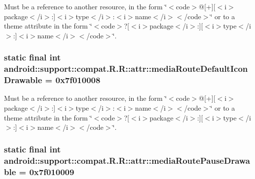 Must be a reference to another resource, in the form \char`\"{}$<$code$>$@\mbox{[}+\mbox{]}\mbox{[}$<$i$>$package$<$/i$>$:\mbox{]}$<$i$>$type$<$/i$>$:$<$i$>$name$<$/i$>$$<$/code$>$\char`\"{} or to a theme attribute in the form \char`\"{}$<$code$>$?\mbox{[}$<$i$>$package$<$/i$>$:\mbox{]}\mbox{[}$<$i$>$type$<$/i$>$:\mbox{]}$<$i$>$name$<$/i$>$$<$/code$>$\char`\"{}. \hypertarget{classandroid_1_1support_1_1compat_1_1_r_1_1attr_fb427320298ec28143324f5e9758ca66}{
\subsubsection[{mediaRouteDefaultIconDrawable}]{\setlength{\rightskip}{0pt plus 5cm}static final int android::support::compat.R.R::attr::mediaRouteDefaultIconDrawable = 0x7f010008}}
\label{classandroid_1_1support_1_1compat_1_1_r_1_1attr_fb427320298ec28143324f5e9758ca66}


Must be a reference to another resource, in the form \char`\"{}$<$code$>$@\mbox{[}+\mbox{]}\mbox{[}$<$i$>$package$<$/i$>$:\mbox{]}$<$i$>$type$<$/i$>$:$<$i$>$name$<$/i$>$$<$/code$>$\char`\"{} or to a theme attribute in the form \char`\"{}$<$code$>$?\mbox{[}$<$i$>$package$<$/i$>$:\mbox{]}\mbox{[}$<$i$>$type$<$/i$>$:\mbox{]}$<$i$>$name$<$/i$>$$<$/code$>$\char`\"{}. \hypertarget{classandroid_1_1support_1_1compat_1_1_r_1_1attr_09377c3f470f11b2e8d9204bd0cb68b2}{
\subsubsection[{mediaRoutePauseDrawable}]{\setlength{\rightskip}{0pt plus 5cm}static final int android::support::compat.R.R::attr::mediaRoutePauseDrawable = 0x7f010009}}
\label{classandroid_1_1support_1_1compat_1_1_r_1_1attr_09377c3f470f11b2e8d9204bd0cb68b2}


